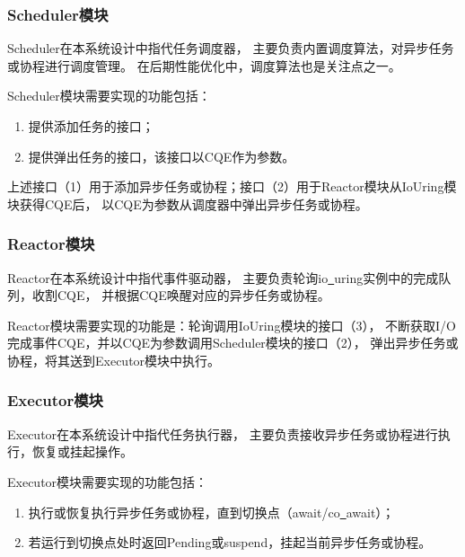 \documentclass[supercite]{HustGraduPaper}
\theoremstyle{definition}
\begin{document}
\subsubsection{Scheduler模块}

Scheduler在本系统设计中指代任务调度器，
主要负责内置调度算法，对异步任务或协程进行调度管理。
在后期性能优化中，调度算法也是关注点之一。\par

Scheduler模块需要实现的功能包括：

\begin{enumerate}
  \item 提供添加任务的接口；
  \item 提供弹出任务的接口，该接口以CQE作为参数。
\end{enumerate}

上述接口（1）用于添加异步任务或协程；接口（2）用于Reactor模块从IoUring模块获得CQE后，
以CQE为参数从调度器中弹出异步任务或协程。\par

\subsubsection{Reactor模块}

Reactor在本系统设计中指代事件驱动器，
主要负责轮询io\underline{~}uring实例中的完成队列，收割CQE，
并根据CQE唤醒对应的异步任务或协程。\par

Reactor模块需要实现的功能是：轮询调用IoUring模块的接口（3），
不断获取I/O完成事件CQE，并以CQE为参数调用Scheduler模块的接口（2），
弹出异步任务或协程，将其送到Executor模块中执行。\par

\subsubsection{Executor模块}

Executor在本系统设计中指代任务执行器，
主要负责接收异步任务或协程进行执行，恢复或挂起操作。\par

Executor模块需要实现的功能包括：

\begin{enumerate}
  \item 执行或恢复执行异步任务或协程，直到切换点（await/co\underline{~}await）；
  \item 若运行到切换点处时返回Pending或suspend，挂起当前异步任务或协程。
\end{enumerate}
\end{document}
